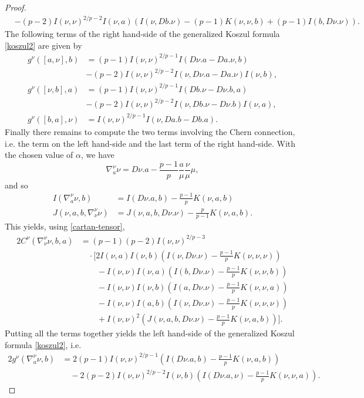 \documentclass[11pt]{amsart}
\theoremstyle{definition}
\begin{document}
\begin{proof}
\begin{align*}
&-(p-2)I(\nu,\nu)^{2/p-2}I(\nu,a)\left(I(\nu,D b.\nu) - (p-1)K(\nu,\nu,b) + (p-1)I(b,D\nu.\nu)\right).
\end{align*}
The following terms of the right hand-side of the generalized Koszul formula \eqref{koszul2} are given by
\begin{align*}
g^\nu([a,\nu],b)&=(p-1)I(\nu,\nu)^{2/p-1}I(D\nu.a-D a.\nu,b)\\
&-(p-2)I(\nu,\nu)^{2/p-2}I(\nu,D\nu.a-D a.\nu)I(\nu,b),\\
g^\nu([\nu,b],a)&=(p-1)I(\nu,\nu)^{2/p-1}I(D b.\nu-D\nu.b,a)\\
&-(p-2)I(\nu,\nu)^{2/p-2}I(\nu,D b.\nu-D\nu.b)I(\nu,a),\\
g^\nu([b,a],\nu)&=I(\nu,\nu)^{2/p-1}I(\nu,D a.b-D b.a).
\end{align*}
Finally there remains to compute the two terms involving the Chern connection, i.e. the term on the left hand-side and the last term of the right hand-side. With the chosen value of $\alpha$, we have
$$\nabla^\nu_a\nu=D\nu.a-\frac{p-1}{p}\frac{a}{\mu}\frac{\nu}{\mu}\mu,$$
and so
\begin{align*}
I(\nabla^\nu_a\nu,b)&=I(D\nu.a,b)-\frac{p-1}{p}K(\nu,a,b)\\
J(\nu,a,b,\nabla^\nu_\nu\nu)&=J(\nu,a,b,D\nu.\nu)-\frac{p}{p-1}K(\nu,a,b).
\end{align*}
This yields, using \eqref{cartan-tensor},
\begin{align*}
2C^\nu(\nabla^\nu_\nu\nu,b,a)&=(p-1)(p-2)I(\nu,\nu)^{2/p-3}\\
    &\quad \cdot\bigg[2I(\nu,a)I(\nu,b)\left(I(\nu,D\nu.\nu) -\frac{p-1}{p}K(\nu,\nu,\nu)\right) \\ 
    &\qquad-I(\nu,\nu)I(\nu,a)\left(I(b,D\nu.\nu) - \frac{p-1}{p}K(\nu,\nu,b)\right)\\
    &\qquad-I(\nu,\nu)I(\nu,b)\left(I(a,D\nu.\nu)- \frac{p-1}{p}K(\nu,\nu,a)\right) \\
    &\qquad-I(\nu,\nu)I(a,b)\left(I(\nu,D\nu.\nu) - \frac{p-1}{p}K(\nu,\nu,\nu)\right)\\
    &\qquad +I(\nu,\nu)^2\left(J(\nu,a,b,D\nu.\nu)-\frac{p-1}{p}K(\nu,a,b)\right)\bigg].
\end{align*}
Putting all the terms together yields the left hand-side of the generalized Koszul formula \eqref{koszul2}, i.e.
\begin{align*}
2g^\nu(\nabla^\nu_a\nu,b)&=2(p-1)I(\nu,\nu)^{2/p-1}\left(I(D\nu.a,b)-\frac{p-1}{p}K(\nu,a,b)\right)\\
&\quad-2(p-2)I(\nu,\nu)^{2/p-2}I(\nu,b)\left(I(D\nu.a,\nu)-\frac{p-1}{p}K(\nu,\nu,a)\right).
\end{align*}
\end{proof}
\end{document}
